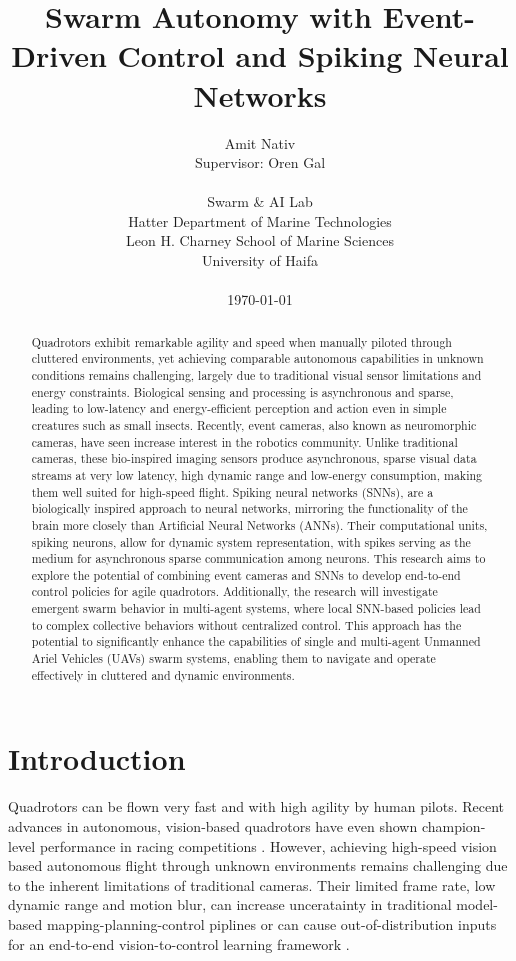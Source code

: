 \documentclass{article}
\title{Swarm Autonomy with Event-Driven Control and Spiking Neural Networks}
\author{
    Amit Nativ \\ 
    Supervisor: Oren Gal \\
    \\
    Swarm \& AI Lab \\
    Hatter Department of Marine Technologies \\
    Leon H. Charney School of Marine Sciences \\
    University of Haifa \\
    \\
    \today
}
\begin{document}
\maketitle

\begin{abstract}
    Quadrotors exhibit remarkable agility and speed when manually piloted through cluttered environments, yet achieving comparable autonomous capabilities in unknown conditions remains challenging, largely due to traditional visual sensor limitations and energy constraints. Biological sensing and processing is asynchronous and sparse, leading to low-latency and energy-efficient perception and action even in simple creatures such as small insects. Recently, event cameras, also known as neuromorphic cameras, have seen increase interest in the robotics community. Unlike traditional cameras, these bio-inspired imaging sensors produce asynchronous, sparse visual data streams at very low latency, high dynamic range and low-energy consumption, making them well suited for high-speed flight. Spiking neural networks (SNNs), are a biologically inspired approach to neural networks, mirroring the functionality of the brain more closely than Artificial Neural Networks (ANNs). Their computational units, spiking neurons, allow for dynamic system representation, with spikes serving as the medium for asynchronous sparse communication among neurons. This research aims to explore the potential of combining event cameras and SNNs to develop end-to-end control policies for agile quadrotors. Additionally, the research will investigate emergent swarm behavior in multi-agent systems, where local SNN-based policies lead to complex collective behaviors without centralized control. This approach has the potential to significantly enhance the capabilities of single and multi-agent Unmanned Ariel Vehicles (UAVs) swarm systems, enabling them to navigate and operate effectively in cluttered and dynamic environments.
\end{abstract}

\section{Introduction}
Quadrotors can be flown very fast and with high agility by human pilots. Recent advances in autonomous, vision-based quadrotors have even shown champion-level performance in racing competitions \cite{kaufmannChampionlevelDroneRacing2023, romeroDreamFlyModelBased2025a, loquercioLearningHighSpeedFlight2021}. However, achieving high-speed vision based autonomous flight through unknown environments remains challenging due to the inherent limitations of traditional cameras. Their limited frame rate, low dynamic range and motion blur, can increase unceratainty in traditional model-based mapping-planning-control piplines or can cause out-of-distribution inputs for an end-to-end vision-to-control learning framework \cite{bhattacharyaVisionTransformersEndtoEnd2025}. 
\end{document}
